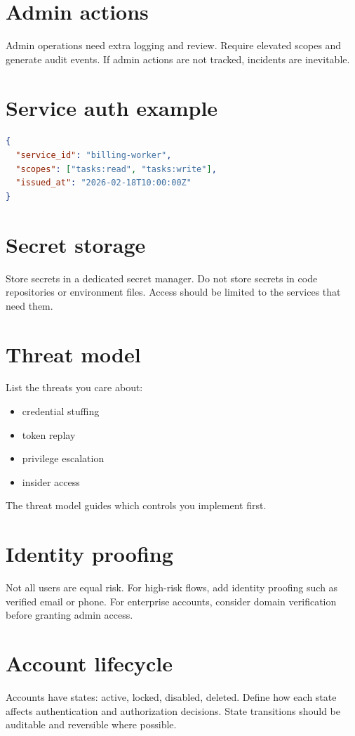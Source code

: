 \section{Admin actions}
Admin operations need extra logging and review.
Require elevated scopes and generate audit events.
If admin actions are not tracked, incidents are inevitable.

\section{Service auth example}
\begin{lstlisting}[language=JSON]
{
  "service_id": "billing-worker",
  "scopes": ["tasks:read", "tasks:write"],
  "issued_at": "2026-02-18T10:00:00Z"
}
\end{lstlisting}

\section{Secret storage}
Store secrets in a dedicated secret manager.
Do not store secrets in code repositories or environment files.
Access should be limited to the services that need them.

\section{Threat model}
List the threats you care about:
\begin{itemize}[nosep]
  \item credential stuffing
  \item token replay
  \item privilege escalation
  \item insider access
\end{itemize}

The threat model guides which controls you implement first.

\section{Identity proofing}
Not all users are equal risk.
For high-risk flows, add identity proofing such as verified email or phone.
For enterprise accounts, consider domain verification before granting admin access.

\section{Account lifecycle}
Accounts have states: active, locked, disabled, deleted.
Define how each state affects authentication and authorization decisions.
State transitions should be auditable and reversible where possible.


